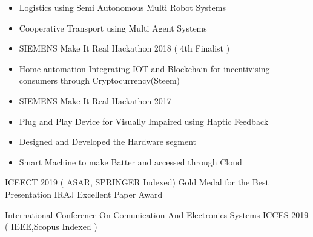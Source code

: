 \documentclass[10pt,a4paper]{altacv}
\begin{document}

\begin{itemize}
\item Logistics using Semi Autonomous Multi Robot Systems
\item Cooperative Transport  using Multi Agent Systems
\end{itemize}
\begin{itemize}
\item SIEMENS Make It Real Hackathon 2018 ( 4th Finalist )
\item Home automation Integrating  IOT and Blockchain for incentivising consumers through Cryptocurrency(Steem)
\end{itemize}
\begin{itemize}
\item SIEMENS Make It Real Hackathon 2017
\item Plug and Play Device for Visually Impaired using Haptic Feedback
\end{itemize}
\begin{itemize}
\item Designed and Developed the Hardware segment
\item Smart Machine to make Batter and accessed through Cloud
\end{itemize}



{ICEECT 2019 ( ASAR, SPRINGER Indexed)
\newline Gold Medal for the Best Presentation 
\newline IRAJ Excellent Paper Award }


{International Conference On Comunication And Electronics Systems  ICCES 2019 ( IEEE,Scopus Indexed )}





\clearpage




\end{document}
